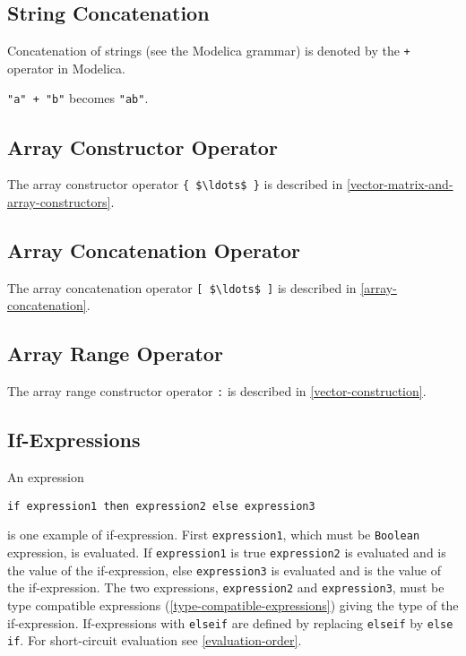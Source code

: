 \subsection{String Concatenation}\label{string-concatenation}

Concatenation of strings (see the Modelica grammar) is denoted by the \lstinline!+!
operator in Modelica.

\begin{example}
\lstinline!"a" + "b"! becomes \lstinline!"ab"!.
\end{example}

\subsection{Array Constructor Operator}\label{array-constructor-operator}

The array constructor operator \lstinline!{ $\ldots$ }! is described in \cref{vector-matrix-and-array-constructors}.

\subsection{Array Concatenation Operator}\label{array-concatenation-operator}

The array concatenation operator \lstinline![ $\ldots$ ]! is described in \cref{array-concatenation}.

\subsection{Array Range Operator}\label{array-range-operator}

The array range constructor operator \lstinline!:! is described in \cref{vector-construction}.

\subsection{If-Expressions}\label{if-expressions}

An expression
\begin{lstlisting}[language=modelica]
if expression1 then expression2 else expression3
\end{lstlisting}%
is one example of if-expression. First \lstinline!expression1!, which must be \lstinline!Boolean! expression, is evaluated.
If \lstinline!expression1! is true \lstinline!expression2! is evaluated and is the value of the if-expression, else \lstinline!expression3! is evaluated and is the value of the if-expression.
The two expressions, \lstinline!expression2! and \lstinline!expression3!, must be type compatible expressions (\cref{type-compatible-expressions}) giving the type of the if-expression.
If-expressions with \lstinline!elseif! are defined by replacing \lstinline!elseif! by \lstinline!else if!.
For short-circuit evaluation see \cref{evaluation-order}.

